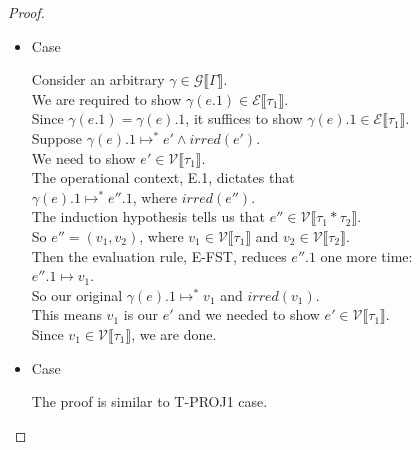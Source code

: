 \documentclass{article}
\begin{document}
\begin{proof}
\begin{itemize}
\begin{itemize}
\item Case \begin{mathpar}  \end{mathpar}
  Consider an arbitrary $\gamma \in \mathcal{G} \llbracket \Gamma \rrbracket$.\\
  We are required to show $\gamma(e.1) \in \mathcal{E} \llbracket \tau_1 \rrbracket$.\\
  Since $\gamma(e.1) = \gamma(e).1$, it suffices to show $\gamma(e).1 \in \mathcal{E} \llbracket \tau_1 \rrbracket$.\\
  Suppose $\gamma(e).1 \mapsto^* e' \wedge irred(e')$.\\
  We need to show $e' \in \mathcal{V} \llbracket \tau_1 \rrbracket$.\\
  The operational context, E.1, dictates that\\
  $\gamma(e).1 \mapsto^* e''.1$, where $irred(e'')$.\\
  The induction hypothesis tells us that $e'' \in \mathcal{V} \llbracket \tau_1 * \tau_2 \rrbracket$.\\
  So $e'' = (v_1, v_2)$, where $v_1 \in \mathcal{V} \llbracket \tau_1 \rrbracket$ and $v_2 \in \mathcal{V} \llbracket \tau_2 \rrbracket$.\\
  Then the evaluation rule, E-FST, reduces $e''.1$ one more time:\\
  $e''.1 \mapsto v_1$.\\
  So our original $\gamma(e).1 \mapsto^* v_1$ and $irred(v_1)$.\\
  This means $v_1$ is our $e'$ and we needed to show $e' \in \mathcal{V} \llbracket \tau_1 \rrbracket$.\\
  Since $v_1 \in \mathcal{V} \llbracket \tau_1 \rrbracket$, we are done.


\item Case \begin{mathpar}  \end{mathpar}
  The proof is similar to T-PROJ1 case.

\newpage          


\end{itemize}
\end{itemize}
\end{proof}
\end{document}
